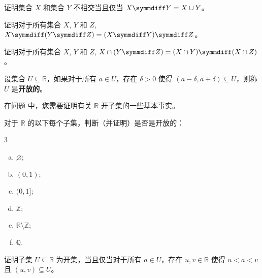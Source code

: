 \begin{chapex}
证明集合 $X$ 和集合 $Y$ 不相交当且仅当 $X \symmdiff Y = X \cup Y$。
\end{chapex}

\begin{chapex}
证明对于所有集合 $X$, $Y$ 和 $Z$, $X \symmdiff (Y \symmdiff Z) = (X \symmdiff Y) \symmdiff Z$。
\end{chapex}

\begin{chapex}
\label{cqSymmetricDifferenceEnd}
证明对于所有集合 $X$, $Y$ 和 $Z$, $X \cap (Y \symmdiff Z) = (X \cap Y) \symmdiff (X \cap Z)$。
\end{chapex}

\begin{definition}
\label{defOpenSubsetOfR}
设集合 $U \subseteq \mathbb{R}$，如果对于所有 $a \in U$，存在 $\delta > 0$ 使得 $(a-\delta, a+\delta) \subseteq U$，则称 $U$ 是\textbf{开放的}。
\end{definition}

在问题  中，您需要证明有关 $\mathbb{R}$ 开子集的一些基本事实。

\begin{chapex}
\label{cqOpenSubsetsOfRBegin}
对于 $\mathbb{R}$ 的以下每个子集，判断（并证明）是否是开放的：
\begin{multicols}{3}
\begin{enumerate}[(a)]
\item $\varnothing$;
\item $(0,1)$;
\item $(0,1]$;
\item $\mathbb{Z}$;
\item $\mathbb{R} \setminus \mathbb{Z}$;
\item $\mathbb{Q}$.
\end{enumerate}
\end{multicols}
\end{chapex}

\begin{chapex}
证明子集 $U \subseteq \mathbb{R}$ 为开集，当且仅当对于所有 $a \in U$，存在 $u,v \in \mathbb{R}$ 使得 $u<a <v$ 且 $(u,v) \subseteq U$。
\end{chapex}


